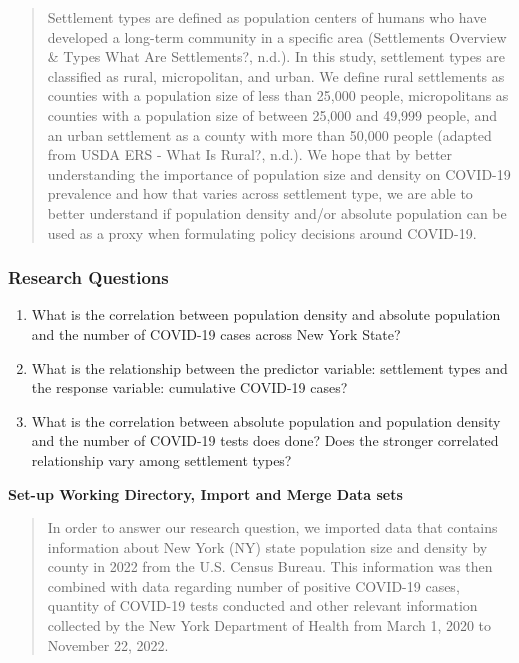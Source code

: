 \documentclass[
  12pt,
]{article}
\begin{document}
\begin{quote}
Settlement types are defined as population centers of humans who have
developed a long-term community in a specific area (Settlements Overview
\& Types \textbar{} What Are Settlements?, n.d.). In this study,
settlement types are classified as rural, micropolitan, and urban. We
define rural settlements as counties with a population size of less than
25,000 people, micropolitans as counties with a population size of
between 25,000 and 49,999 people, and an urban settlement as a county
with more than 50,000 people (adapted from USDA ERS - What Is Rural?,
n.d.). We hope that by better understanding the importance of population
size and density on COVID-19 prevalence and how that varies across
settlement type, we are able to better understand if population density
and/or absolute population can be used as a proxy when formulating
policy decisions around COVID-19.
\end{quote}

\hypertarget{research-questions}{%
\subsubsection{Research Questions}\label{research-questions}}

\begin{enumerate}
\def\labelenumi{\arabic{enumi}.}
\item
  What is the correlation between population density and absolute
  population and the number of COVID-19 cases across New York State?
\item
  What is the relationship between the predictor variable: settlement
  types and the response variable: cumulative COVID-19 cases?
\item
  What is the correlation between absolute population and population
  density and the number of COVID-19 tests does done? Does the stronger
  correlated relationship vary among settlement types?
\end{enumerate}

\newpage

\textbf{Set-up Working Directory, Import and Merge Data sets}

\begin{quote}
In order to answer our research question, we imported data that contains
information about New York (NY) state population size and density by
county in 2022 from the U.S. Census Bureau. This information was then
combined with data regarding number of positive COVID-19 cases, quantity
of COVID-19 tests conducted and other relevant information collected by
the New York Department of Health from March 1, 2020 to November 22,
2022.
\end{quote}
\end{document}
